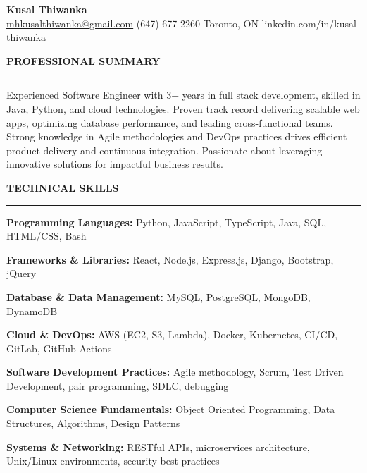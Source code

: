 \documentclass[10pt,letterpaper]{article}
\begin{document}
\begin{center}
{\LARGE\textbf{Kusal Thiwanka}}\\[1pt]
\href{mailto:mhkusalthiwanka@gmail.com}{mhkusalthiwanka@gmail.com}\hspace{2em}%
(647) 677{-}2260\hspace{2em}%
Toronto, ON\hspace{2em}
linkedin.com/in/kusal-thiwanka
\end{center}

\vspace{6pt}

\textbf{PROFESSIONAL SUMMARY}\\[-8pt]
\noindent\rule{\textwidth}{1pt}

\vspace{-2pt}

Experienced Software Engineer with 3+ years in full stack development, skilled in Java, Python, and cloud technologies. Proven track record delivering scalable web apps, optimizing database performance, and leading cross-functional teams. Strong knowledge in Agile methodologies and DevOps practices drives efficient product delivery and continuous integration. Passionate about leveraging innovative solutions for impactful business results.

\vspace{3pt}

\textbf{TECHNICAL SKILLS}\\[-8pt]
\noindent\rule{\textwidth}{1pt}

\vspace{-2pt}

\textbf{Programming Languages:} Python, JavaScript, TypeScript, Java, SQL, HTML/CSS, Bash

\textbf{Frameworks \& Libraries:} React, Node.js, Express.js, Django, Bootstrap, jQuery

\textbf{Database \& Data Management:} MySQL, PostgreSQL, MongoDB, DynamoDB

\textbf{Cloud \& DevOps:} AWS (EC2, S3, Lambda), Docker, Kubernetes, CI/CD, GitLab, GitHub Actions

\textbf{Software Development Practices:} Agile methodology, Scrum, Test Driven Development, pair programming, SDLC, debugging

\textbf{Computer Science Fundamentals:} Object Oriented Programming, Data Structures, Algorithms, Design Patterns

\textbf{Systems \& Networking:} RESTful APIs, microservices architecture, Unix/Linux environments, security best practices
\end{document}
